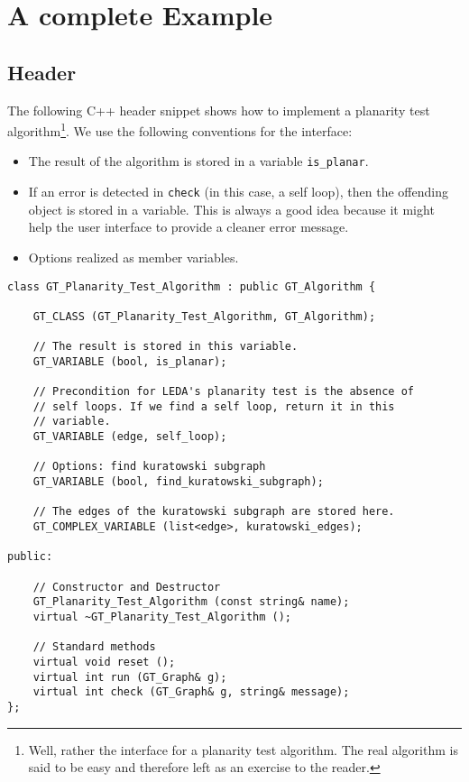 \documentclass[twoside,fleqn]{report}
\begin{document}
%
%

\section{A complete Example}
\label{s:Algorithm:Example}


\subsection{Header}
\label{s:Algorithm:Example:Header}

The following C++ header snippet shows how to implement a
planarity test algorithm\footnote{Well, rather the interface for
  a planarity test algorithm. The real algorithm is said to be
  easy and therefore left as an exercise to the reader.}.  We use
the following conventions for the interface:

\begin{itemize}
  
  \item The result of the algorithm is stored in a variable
  \texttt{is\_planar}.
  
  \item If an error is detected in \texttt{check} (in this case,
  a self loop), then the offending object is stored in a
  variable. This is always a good idea because it might help the
  user interface to provide a cleaner error message.

  \item Options realized as member variables.

\end{itemize}


\begin{verbatim}
class GT_Planarity_Test_Algorithm : public GT_Algorithm {

    GT_CLASS (GT_Planarity_Test_Algorithm, GT_Algorithm);

    // The result is stored in this variable.
    GT_VARIABLE (bool, is_planar);

    // Precondition for LEDA's planarity test is the absence of
    // self loops. If we find a self loop, return it in this
    // variable.
    GT_VARIABLE (edge, self_loop);

    // Options: find kuratowski subgraph
    GT_VARIABLE (bool, find_kuratowski_subgraph);

    // The edges of the kuratowski subgraph are stored here.
    GT_COMPLEX_VARIABLE (list<edge>, kuratowski_edges);
    
public:

    // Constructor and Destructor
    GT_Planarity_Test_Algorithm (const string& name);
    virtual ~GT_Planarity_Test_Algorithm ();

    // Standard methods
    virtual void reset ();
    virtual int run (GT_Graph& g);
    virtual int check (GT_Graph& g, string& message);
};
\end{verbatim}
\end{document}
